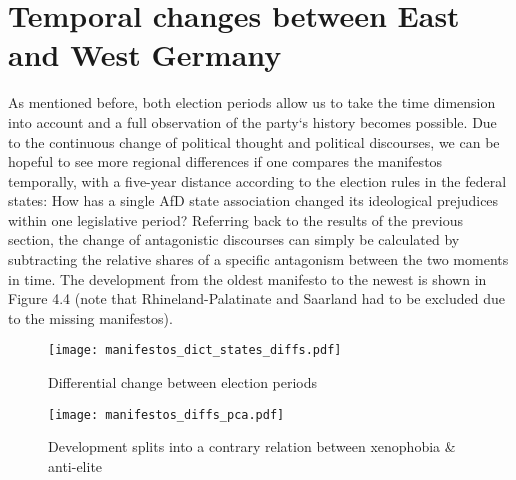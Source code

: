 \documentclass[a4paper]{scrreprt}
\begin{document}
\section{Temporal changes between East and West Germany}
As mentioned before, both election periods allow us to take the time dimension into account and a full observation of the party‘s history becomes possible. Due to the continuous change of political thought and political discourses, we can be hopeful to see more regional differences if one compares the manifestos temporally, with a five-year distance according to the election rules in the federal states: How has a single AfD state association changed its ideological prejudices within one legislative period? Referring back to the results of the previous section, the change of antagonistic discourses can simply be calculated by subtracting the relative shares of a specific antagonism between the two moments in time. The development from the oldest manifesto to the newest is shown in Figure 4.4 (note that Rhineland-Palatinate and Saarland had to be excluded due to the missing manifestos).\par
\begin{figure}[ht]
    \centering
    \texttt{[image: manifestos\_dict\_states\_diffs.pdf]}
    \caption{Differential change between election periods}
    \label{fig:fig5}
\end{figure}
\begin{figure}[ht]
    \centering
    \texttt{[image: manifestos\_diffs\_pca.pdf]}
    \caption{Development splits into a contrary relation between xenophobia \& anti-elite}
    \label{fig:fig6}
\end{figure}
\end{document}
